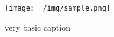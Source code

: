 \begin{figure}[H]
	\centering
	\texttt{[image: ~/img/sample.png]}
	\caption{very basic caption}
	\label{fig:sample_figure}
\end{figure}
